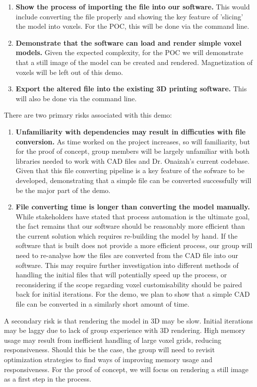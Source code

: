 \documentclass{article}
\begin{document}
\begin{enumerate}
  \item \textbf{Show the process of importing the file into our software.} This would include converting the file properly and showing the key feature of 'slicing' the model into voxels. For the POC, this will be done via the command line.
  \item \textbf{Demonstrate that the software can load and render simple voxel models.} Given the expected complexity, for the POC we will demonstrate that a still image of the model can be created and rendered. Magnetization of voxels will be left out of this demo.
  \item \textbf{Export the altered file into the existing 3D printing software.} This will also be done via the command line.
\end{enumerate}

There are two primary risks associated with this demo:

\begin{enumerate}
  \item \textbf{Unfamiliarity with dependencies may result in difficuties with file conversion.} As time worked on the project increases, so will familiarity, but for the proof of concept, group members will be largely unfamiliar with both libraries needed to work with CAD files and Dr. Onaizah's current codebase. Given that this file converting pipeline is a key feature of the sofware to be developed, demonstrating that a simple file can be converted successfully will be the major part of the demo.
  \item \textbf{File converting time is longer than converting the model manually.} While stakeholders have stated that process automation is the ultimate goal, the fact remains that our software should be reasonably more efficient than the current solution which requires re-building the model by hand. If the software that is built does not provide a more efficient process, our group will need to re-analyse how the files are converted from the CAD file into our software. This may require further investigation into different methods of handling the initial files that will potentially speed up the process, or reconsidering if the scope regarding voxel customisability should be paired back for initial iterations. For the demo, we plan to show that a simple CAD file can be converted in a similarly short amount of time.
\end{enumerate}

A secondary risk is that rendering the model in 3D may be slow. Initial iterations may be laggy 
due to lack of group experience with 3D rendering. High memory usage may result from 
inefficient handling of large voxel grids, reducing responsiveness. Should this be 
the case, the group will need to revisit optimization strategies to find ways of 
improving memory usage and responsiveness. For the proof of concept, we will focus on 
rendering a still image as a first step in the process.
\end{document}
